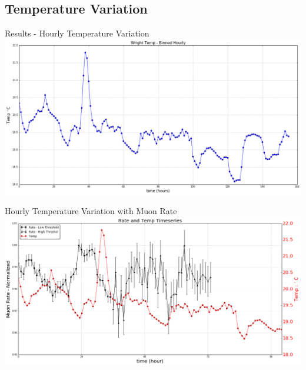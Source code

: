 \documentclass{beamer}
\begin{document}
\subsection{Temperature Variation}

\begin{frame}{Results - Hourly Temperature Variation}
\centering
\includegraphics[scale=.25]{../Figures/tempVariation-Wide.png}
\end{frame}


\begin{frame}{Hourly Temperature Variation with Muon Rate}
\centering
\includegraphics[scale=.25]{../Figures/bothTempVariation-Wide.png}
\end{frame}
\end{document}
